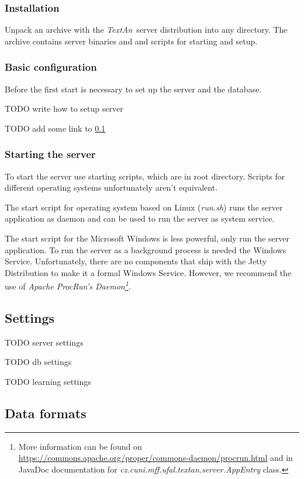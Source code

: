 \documentclass[12pt,a4paper]{report}
\newcommand{\textan}{\emph{TextAn}}
\begin{document}
\subsubsection{Installation}

Unpack an archive with the \textan\ server distribution into any directory. The archive contains server binaries and and scripts for starting and setup.

\subsubsection{Basic configuration}

Before the first start is necessary to set up the server and the database.

TODO write how to setup server

TODO add some link to \ref{sec:ServerSettings}

\subsubsection{Starting the server}

To start the server use starting scripts, which are in root directory. Scripts for different operating systems unfortunately aren't equivalent.

The start script for operating system based on Linux (\emph{run.sh}) runs the server application as daemon and can be used to run the server as system service.

The start script for the Microsoft Windows is less powerful, only run the server application. To run the server as a background process is needed the Windows Service. Unfortunately, there are no components that ship with the Jetty Distribution to make it a formal Windows Service. However, we recommend the use of \emph{Apache ProcRun's Daemon\footnote{More information can be found on \url{https://commons.apache.org/proper/commons-daemon/procrun.html} and in JavaDoc documentation for \emph{cz.cuni.mff.ufal.textan.server.AppEntry} class.}}.

\subsection{Settings}
\label{sec:ServerSettings}

TODO server settings

TODO db settings

TODO learning settings

\subsection{Data formats}
\end{document}
